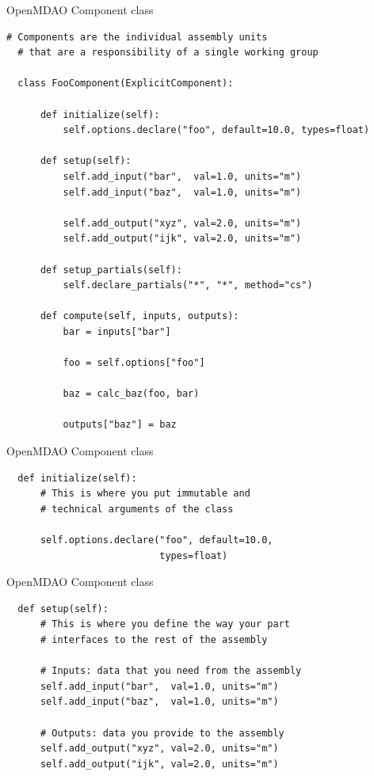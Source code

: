\begin{frame}[fragile]{OpenMDAO Component class}
  \begin{lstlisting}[basicstyle=\ttfamily\tiny]
  # Components are the individual assembly units
  # that are a responsibility of a single working group

  class FooComponent(ExplicitComponent):

      def initialize(self):
          self.options.declare("foo", default=10.0, types=float)

      def setup(self):
          self.add_input("bar",  val=1.0, units="m")
          self.add_input("baz",  val=1.0, units="m")

          self.add_output("xyz", val=2.0, units="m")
          self.add_output("ijk", val=2.0, units="m")

      def setup_partials(self):
          self.declare_partials("*", "*", method="cs")

      def compute(self, inputs, outputs):
          bar = inputs["bar"]

          foo = self.options["foo"]

          baz = calc_baz(foo, bar)

          outputs["baz"] = baz
  \end{lstlisting}
\end{frame}

\begin{frame}[fragile]{OpenMDAO Component class}
  \begin{lstlisting}
  def initialize(self):
      # This is where you put immutable and
      # technical arguments of the class

      self.options.declare("foo", default=10.0,
                           types=float)
  \end{lstlisting}
\end{frame}

\begin{frame}[fragile]{OpenMDAO Component class}
  \begin{lstlisting}
  def setup(self):
      # This is where you define the way your part
      # interfaces to the rest of the assembly

      # Inputs: data that you need from the assembly
      self.add_input("bar",  val=1.0, units="m")
      self.add_input("baz",  val=1.0, units="m")

      # Outputs: data you provide to the assembly
      self.add_output("xyz", val=2.0, units="m")
      self.add_output("ijk", val=2.0, units="m")
  \end{lstlisting}
\end{frame}

